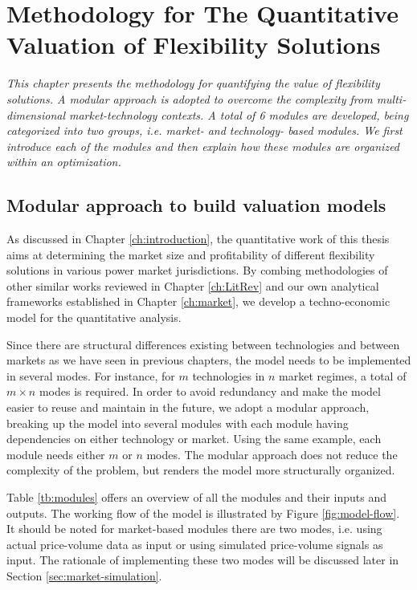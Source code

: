 \chapter{Methodology for The Quantitative Valuation of Flexibility Solutions}
\label{ch:methodology}
\textit{This chapter presents the methodology for quantifying the value of flexibility solutions. A modular approach is adopted to overcome the complexity from multi-dimensional market-technology contexts. A total of 6 modules are developed, being categorized into two groups, i.e. market- and technology- based modules. We first introduce each of the modules and then explain how these modules are organized within an optimization.}

\section{Modular approach to build valuation models}
As discussed in Chapter \ref{ch:introduction}, the quantitative work of this thesis aims at determining the market size and profitability of different flexibility solutions in various power market jurisdictions. By combing methodologies of other similar works reviewed in Chapter \ref{ch:LitRev} and our own analytical frameworks established in Chapter \ref{ch:market}, we develop a techno-economic model for the quantitative analysis. 

Since there are structural differences existing between technologies and between markets as we have seen in previous chapters, the model needs to be implemented in several modes. For instance, for $m$ technologies in $n$ market regimes, a total of $m \times n$ modes is required. In order to avoid redundancy and make the model easier to reuse and maintain in the future, we adopt a modular approach, breaking up the model into several modules with each module having dependencies on either technology or market. Using the same example, each module needs either $m$ or $n$ modes. The modular approach does not reduce the complexity of the problem, but renders the model more structurally organized.

Table \ref{tb:modules} offers an overview of all the modules and their inputs and outputs. The working flow of the model is illustrated by Figure \ref{fig:model-flow}. It should be noted for market-based modules there are two modes, i.e. using actual price-volume data  as input or using simulated price-volume signals as input. The rationale of implementing these two modes will be discussed later in Section \ref{sec:market-simulation}. %

